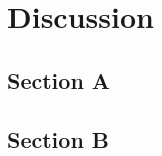 \chapter{Discussion}\label{ch:discussion} %
\lipsum[3]

\section{Section A}
\lipsum[6-10]

\section{Section B}
\lipsum[10-18]
